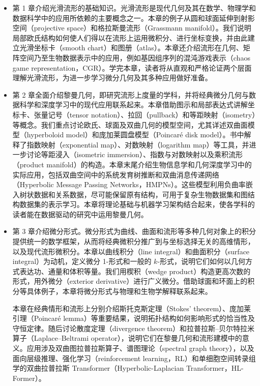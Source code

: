 \begin{itemize}
  \item 第 1 章介绍光滑流形的基础知识。光滑流形是现代几何及其在数学、物理学和数据科学中的应用所依赖的主要概念之一。本章的例子从圆和球面延伸到射影空间（projective space）和格拉斯曼流形（Grassmann manifold）。我们说明局部欧氏结构如何使人们得以在流形上运用微积分、进行坐标变换，并由此建立光滑坐标卡（smooth chart）和图册（atlas）。本章还介绍流形在几何、矩阵空间乃至生物数据表示中的应用，例如基因组序列的混沌游戏表示（chaos game representation，CGR）。学完本章，读者将从直观和严格论证两个层面理解光滑流形，为进一步学习微分几何及其多种应用做好准备。

  \item 第 2 章全面介绍黎曼几何，即研究流形上度量的学科，并将经典微分几何与数据科学和深度学习中的现代应用联系起来。本章借助图示和局部表达式讲解坐标卡、张量记号（tensor notation）、拉回（pullback）和等距映射（isometry）等概念。我们重点讨论欧氏、球面及双曲几何的模型空间，尤其详述双曲面模型（hyperboloid model）和庞加莱圆盘模型（Poincaré disk model）。书中解释了指数映射（exponential map）、对数映射（logarithm map）等工具，并进一步讨论等距浸入（isometric immersion）、指数与对数映射以及乘积流形（product manifold）的构造。本章末尾介绍生物信息学和几何深度学习中的实际应用，包括双曲空间中的系统发育树推断和双曲消息传递网络（Hyperbolic Message Passing Networks，HMPNs）。这些模型利用负曲率嵌入树状数据和关系数据，尽可能保留原有结构，可用于复杂生物数据集和图结构数据集的表示学习。本章将理论基础与机器学习架构结合起来，使各学科的读者能在数据驱动的研究中运用黎曼几何。

  \item 第 3 章介绍微分形式。微分形式为曲线、曲面和流形等多种几何对象上的积分提供统一的数学框架，从而将经典微积分推广到与坐标选择无关的高维情形，以及现代流形微积分。本章以曲线积分（line integral）和曲面积分（surface integral）为动机，定义微分 1-形式和一般的 $k$-形式，说明它们如何以几何方式表达功、通量和体积等量。我们用楔积（wedge product）构造更高次数的形式，用外微分（exterior derivative）进行广义微分。借助球面和环面上的积分等具体例子，本章将微分形式与物理和生物学解释联系起来。

  本章在经典情形和流形上分别介绍斯托克斯定理（Stokes' theorem）、庞加莱引理（Poincaré lemma）等重要结果，说明拓扑结构如何影响形式的恰当性及守恒定律。随后讨论散度定理（divergence theorem）和拉普拉斯–贝尔特拉米算子（Laplace–Beltrami operator），说明它们在黎曼几何和流形建模中的意义。应用涉及双曲图拉普拉斯算子、谱图理论（spectral graph theory），以及面向层级推理、强化学习（reinforcement learning，RL）和单细胞空间转录组学的双曲拉普拉斯 Transformer（Hyperbolic-Laplacian Transformer，HL-Former）。


\end{itemize}
